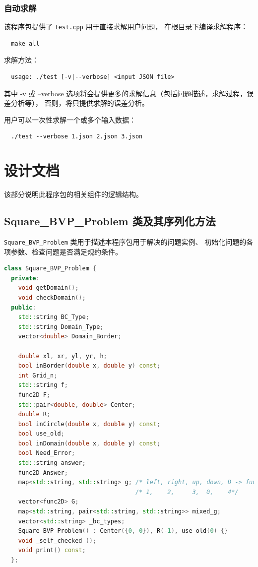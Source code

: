 \documentclass[lang=cn,a4paper,newtx,bibend=bibtex]{elegantpaper}
\begin{document}
\subsubsection{自动求解}

该程序包提供了 \texttt{test.cpp} 用于直接求解用户问题，
在根目录下编译求解程序：

\begin{lstlisting}
  make all
\end{lstlisting}

求解方法：
\begin{lstlisting}
  usage: ./test [-v|--verbose] <input JSON file>
\end{lstlisting}

其中 -v 或 --verbose 选项将会提供更多的求解信息（包括问题描述，求解过程，误差分析等），
否则，将只提供求解的误差分析。

用户可以一次性求解一个或多个输入数据：
\begin{lstlisting}
  ./test --verbose 1.json 2.json 3.json
\end{lstlisting}

\section{设计文档}

该部分说明此程序包的相关组件的逻辑结构。

\subsection{Square\_BVP\_Problem 类及其序列化方法}\label{2.1}

\texttt{Square\_BVP\_Problem} 类用于描述本程序包用于解决的问题实例、
初始化问题的各项参数、检查问题是否满足规约条件。

\begin{lstlisting}[language = C++]
  class Square_BVP_Problem {
  private:
    void getDomain();
    void checkDomain();
  public:
    std::string BC_Type;
    std::string Domain_Type;
    vector<double> Domain_Border;

    double xl, xr, yl, yr, h;
    bool inBorder(double x, double y) const;
    int Grid_n;
    std::string f;
    func2D F;
    std::pair<double, double> Center;
    double R;
    bool inCircle(double x, double y) const;
    bool use_old;
    bool inDomain(double x, double y) const;
    bool Need_Error;
    std::string answer;
    func2D Answer;
    map<std::string, std::string> g; /* left, right, up, down, D -> function*/
                                     /* 1,    2,     3,  0,    4*/
    vector<func2D> G;
    map<std::string, pair<std::string, std::string>> mixed_g;
    vector<std::string> _bc_types;
    Square_BVP_Problem() : Center({0, 0}), R(-1), use_old(0) {}
    void _self_checked ();
    void print() const;
  };
\end{lstlisting}
\end{document}
